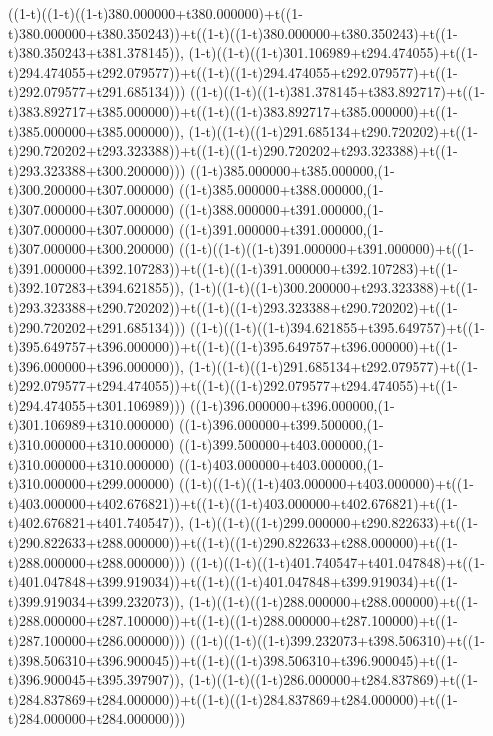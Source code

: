 ((1-t)((1-t)((1-t)380.000000+t380.000000)+t((1-t)380.000000+t380.350243))+t((1-t)((1-t)380.000000+t380.350243)+t((1-t)380.350243+t381.378145)),                                     (1-t)((1-t)((1-t)301.106989+t294.474055)+t((1-t)294.474055+t292.079577))+t((1-t)((1-t)294.474055+t292.079577)+t((1-t)292.079577+t291.685134)))
((1-t)((1-t)((1-t)381.378145+t383.892717)+t((1-t)383.892717+t385.000000))+t((1-t)((1-t)383.892717+t385.000000)+t((1-t)385.000000+t385.000000)),                                     (1-t)((1-t)((1-t)291.685134+t290.720202)+t((1-t)290.720202+t293.323388))+t((1-t)((1-t)290.720202+t293.323388)+t((1-t)293.323388+t300.200000)))
((1-t)385.000000+t385.000000,(1-t)300.200000+t307.000000)
((1-t)385.000000+t388.000000,(1-t)307.000000+t307.000000)
((1-t)388.000000+t391.000000,(1-t)307.000000+t307.000000)
((1-t)391.000000+t391.000000,(1-t)307.000000+t300.200000)
((1-t)((1-t)((1-t)391.000000+t391.000000)+t((1-t)391.000000+t392.107283))+t((1-t)((1-t)391.000000+t392.107283)+t((1-t)392.107283+t394.621855)),                                     (1-t)((1-t)((1-t)300.200000+t293.323388)+t((1-t)293.323388+t290.720202))+t((1-t)((1-t)293.323388+t290.720202)+t((1-t)290.720202+t291.685134)))
((1-t)((1-t)((1-t)394.621855+t395.649757)+t((1-t)395.649757+t396.000000))+t((1-t)((1-t)395.649757+t396.000000)+t((1-t)396.000000+t396.000000)),                                     (1-t)((1-t)((1-t)291.685134+t292.079577)+t((1-t)292.079577+t294.474055))+t((1-t)((1-t)292.079577+t294.474055)+t((1-t)294.474055+t301.106989)))
((1-t)396.000000+t396.000000,(1-t)301.106989+t310.000000)
((1-t)396.000000+t399.500000,(1-t)310.000000+t310.000000)
((1-t)399.500000+t403.000000,(1-t)310.000000+t310.000000)
((1-t)403.000000+t403.000000,(1-t)310.000000+t299.000000)
((1-t)((1-t)((1-t)403.000000+t403.000000)+t((1-t)403.000000+t402.676821))+t((1-t)((1-t)403.000000+t402.676821)+t((1-t)402.676821+t401.740547)),                                     (1-t)((1-t)((1-t)299.000000+t290.822633)+t((1-t)290.822633+t288.000000))+t((1-t)((1-t)290.822633+t288.000000)+t((1-t)288.000000+t288.000000)))
((1-t)((1-t)((1-t)401.740547+t401.047848)+t((1-t)401.047848+t399.919034))+t((1-t)((1-t)401.047848+t399.919034)+t((1-t)399.919034+t399.232073)),                                     (1-t)((1-t)((1-t)288.000000+t288.000000)+t((1-t)288.000000+t287.100000))+t((1-t)((1-t)288.000000+t287.100000)+t((1-t)287.100000+t286.000000)))
((1-t)((1-t)((1-t)399.232073+t398.506310)+t((1-t)398.506310+t396.900045))+t((1-t)((1-t)398.506310+t396.900045)+t((1-t)396.900045+t395.397907)),                                     (1-t)((1-t)((1-t)286.000000+t284.837869)+t((1-t)284.837869+t284.000000))+t((1-t)((1-t)284.837869+t284.000000)+t((1-t)284.000000+t284.000000)))
